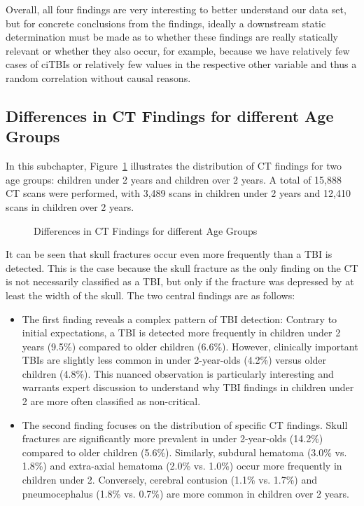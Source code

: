 \documentclass[10pt,letterpaper]{article}
\begin{document}
Overall, all four findings are very interesting to better understand our data set, but for concrete conclusions from the findings, ideally a downstream static determination must be made as to whether these findings are really statically relevant or whether they also occur, for example, because we have relatively few cases of ciTBIs or relatively few values in the respective other variable and thus a random correlation without causal reasons.

\subsection{Differences in CT Findings for different Age Groups}\label{third-finding}

In this subchapter, Figure~\ref{fig:third_finding} illustrates the distribution of CT findings for two age groups: children under 2 years and children over 2 years. A total of 15,888 CT scans were performed, with 3,489 scans in children under 2 years and 12,410 scans in children over 2 years.

\begin{figure}[H]
    \centering
    \caption{Differences in CT Findings for different Age Groups}
    \label{fig:third_finding}
\end{figure}

It can be seen that skull fractures occur even more frequently than a TBI is detected. This is the case because the skull fracture as the only finding on the CT is not necessarily classified as a TBI, but only if the fracture was depressed by at least the width of the skull. The two central findings are as follows:

\begin{itemize}
\item The first finding reveals a complex pattern of TBI detection: Contrary to initial expectations, a TBI is detected more frequently in children under 2 years (9.5\%) compared to older children (6.6\%). However, clinically important TBIs are slightly less common in under 2-year-olds (4.2\%) versus older children (4.8\%). This nuanced observation is particularly interesting and warrants expert discussion to understand why TBI findings in children under 2 are more often classified as non-critical.
\item The second finding focuses on the distribution of specific CT findings. Skull fractures are significantly more prevalent in under 2-year-olds (14.2\%) compared to older children (5.6\%). Similarly, subdural hematoma (3.0\% vs. 1.8\%) and extra-axial hematoma (2.0\% vs. 1.0\%) occur more frequently in children under 2. Conversely, cerebral contusion (1.1\% vs. 1.7\%) and pneumocephalus (1.8\% vs. 0.7\%) are more common in children over 2 years.
\end{itemize}
\end{document}
